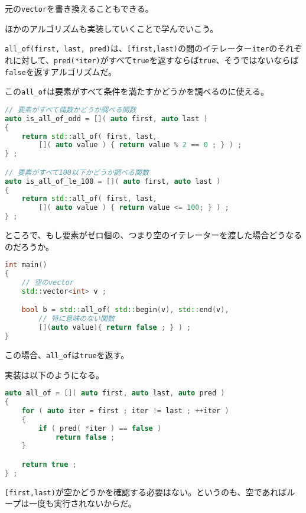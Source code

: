 元の\texttt{vector}を書き換えることもできる。


ほかのアルゴリズムも実装していくことで学んでいこう。

\texttt{all\_of(first, last, pred)}は、\texttt{[first,last)}の間のイテレーター\texttt{iter}のそれぞれに対して、\texttt{pred(*iter)}がすべて\texttt{true}を返すならば\texttt{true}、そうではないならば\texttt{false}を返すアルゴリズムだ。

この\texttt{all\_of}は要素がすべて条件を満たすかどうかを調べるのに使える。

\begin{lstlisting}[language={C++}]
// 要素がすべて偶数かどうか調べる関数
auto is_all_of_odd = []( auto first, auto last )
{
    return std::all_of( first, last,
        []( auto value ) { return value % 2 == 0 ; } ) ;
} ;

// 要素がすべて100以下かどうか調べる関数
auto is_all_of_le_100 = []( auto first, auto last )
{
    return std::all_of( first, last,
        []( auto value ) { return value <= 100; } ) ;
} ;
\end{lstlisting}

ところで、もし要素がゼロ個の、つまり空のイテレーターを渡した場合どうなるのだろうか。

\begin{lstlisting}[language={C++}]
int main()
{
    // 空のvector
    std::vector<int> v ;

    bool b = std::all_of( std::begin(v), std::end(v),
        // 特に意味のない関数
        [](auto value){ return false ; } ) ;
}
\end{lstlisting}

この場合、\texttt{all\_of}は\texttt{true}を返す。

実装は以下のようになる。

\ifTombow\pagebreak\fi
\begin{lstlisting}[language={C++}]
auto all_of = []( auto first, auto last, auto pred )
{
    for ( auto iter = first ; iter != last ; ++iter )
    {
        if ( pred( *iter ) == false )
            return false ;
    }

    return true ;
} ;
\end{lstlisting}

\texttt{[first,last)}が空かどうかを確認する必要はない。というのも、空であればループは一度も実行されないからだ。

